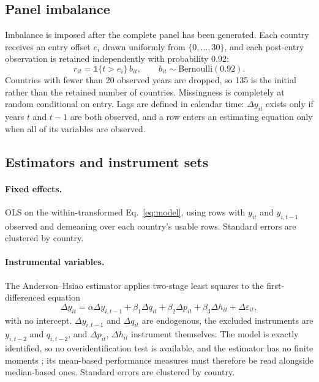 \documentclass[11pt,a4paper]{article}
\begin{document}
\subsection{Panel imbalance}

Imbalance is imposed after the complete panel has been generated. Each country receives an entry offset $e_i$ drawn uniformly from $\{0,\dots,30\}$, and each post-entry observation is retained independently with probability $0.92$:
\begin{equation}\label{eq:obs}
r_{it}=\mathbb{1}\{t>e_i\}\,b_{it},\qquad b_{it}\sim\text{Bernoulli}(0.92).
\end{equation}
Countries with fewer than 20 observed years are dropped, so 135 is the initial rather than the retained number of countries. Missingness is completely at random conditional on entry. Lags are defined in calendar time: $\Delta y_{it}$ exists only if years $t$ and $t-1$ are both observed, and a row enters an estimating equation only when all of its variables are observed.

\subsection{Estimators and instrument sets}\label{sec:est}

\paragraph{Fixed effects.} OLS on the within-transformed Eq.~\eqref{eq:model}, using rows with $y_{it}$ and $y_{i,t-1}$ observed and demeaning over each country's usable rows. Standard errors are clustered by country.

\paragraph{Instrumental variables.} The Anderson--Hsiao estimator applies two-stage least squares to the first-differenced equation
\begin{equation}\label{eq:fd}
\Delta y_{it}=\alpha\Delta y_{i,t-1}+\beta_1\Delta q_{it}+\beta_2\Delta p_{it}+\beta_3\Delta h_{it}+\Delta\varepsilon_{it},
\end{equation}
with no intercept. $\Delta y_{i,t-1}$ and $\Delta q_{it}$ are endogenous, the excluded instruments are $y_{i,t-2}$ and $q_{i,t-2}$, and $\Delta p_{it}$, $\Delta h_{it}$ instrument themselves. The model is exactly identified, so no overidentification test is available, and the estimator has no finite moments \citep{Stock2005}; its mean-based performance measures must therefore be read alongside median-based ones. Standard errors are clustered by country.
\end{document}
